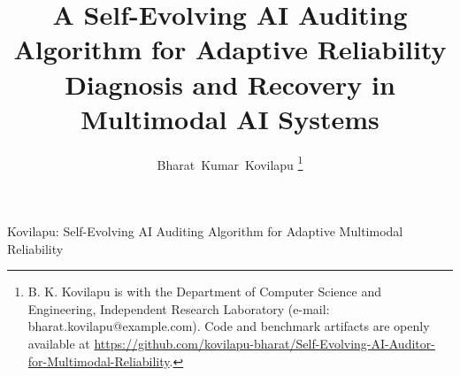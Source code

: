\documentclass[journal]{IEEEtran}
\begin{document}
\title{A Self-Evolving AI Auditing Algorithm for Adaptive Reliability Diagnosis and Recovery in Multimodal AI Systems}

\author{Bharat~Kumar~Kovilapu%
\thanks{B. K. Kovilapu is with the Department of Computer Science and Engineering, Independent Research Laboratory (e-mail: bharat.kovilapu@example.com). Code and benchmark artifacts are openly available at \url{https://github.com/kovilapu-bharat/Self-Evolving-AI-Auditor-for-Multimodal-Reliability}.}}

%
{Kovilapu: Self-Evolving AI Auditing Algorithm for Adaptive Multimodal Reliability}

\maketitle
\end{document}
